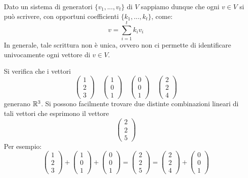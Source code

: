 Dato un sistema di generatori $\{v_1, ..., v_t\}$ di $V$ sappiamo dunque che ogni $v \in V$ si può scrivere,
con opportuni coefficienti $\{k_1, ..., k_t\}$, come:
\[ v = \sum_{i=1}^t k_i v_i \]
In generale, tale scrittura non è unica, ovvero non ci permette di identificare univocamente ogni vettore di
$v \in V$.

\begin{example}
	Si verifica che i vettori
	\[
		\begin{pmatrix}
			1 \\ 2 \\ 3
		\end{pmatrix} \quad
		\begin{pmatrix}
			1 \\ 0 \\ 1
		\end{pmatrix} \quad
		\begin{pmatrix}
			0 \\ 0 \\ 1
		\end{pmatrix} \quad
		\begin{pmatrix}
			2 \\ 2 \\ 4
		\end{pmatrix}
	\]
	generano $\mathbb{R}^3$. Si possono facilmente trovare due distinte combinazioni lineari di tali vettori
	che esprimono il vettore
	\[ \begin{pmatrix} 2 \\ 2 \\ 5 \end{pmatrix} \]
	Per esempio:
	\[
		\begin{pmatrix}
			1 \\ 2 \\ 3
		\end{pmatrix} +
		\begin{pmatrix}
			1 \\ 0 \\ 1
		\end{pmatrix} +
		\begin{pmatrix}
			0 \\ 0 \\ 1
		\end{pmatrix} =
		\begin{pmatrix}
			2 \\ 2 \\ 5
		\end{pmatrix} =
		\begin{pmatrix}
			2 \\ 2 \\ 4
		\end{pmatrix} +
		\begin{pmatrix}
			0 \\ 0 \\ 1
		\end{pmatrix}
	\]
\end{example}

